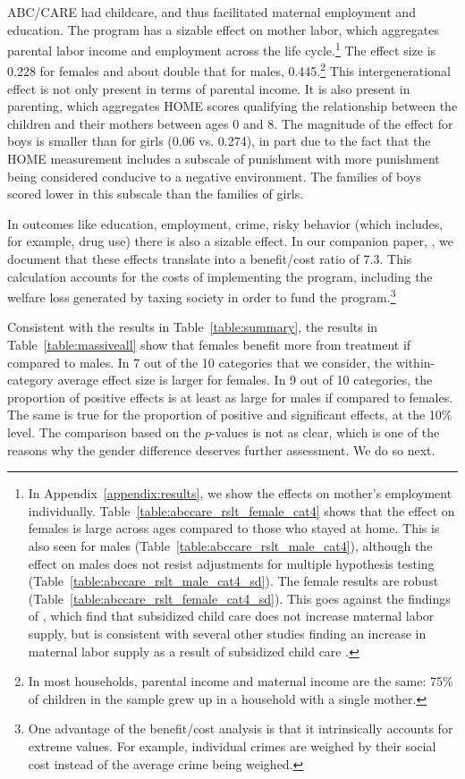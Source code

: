 ABC/CARE had childcare, and thus facilitated maternal employment and education. The program has a sizable effect on mother labor, which aggregates parental labor income and employment across the life cycle.\footnote{In Appendix~\ref{appendix:results}, we show the effects on mother's employment individually. Table~\ref{table:abccare_rslt_female_cat4} shows that the effect on females is large across ages compared to those who stayed at home. This is also seen for males (Table~\ref{table:abccare_rslt_male_cat4}), although the effect on males does not resist adjustments for multiple hypothesis testing (Table~\ref{table:abccare_rslt_male_cat4_sd}). The female results are robust (Table~\ref{table:abccare_rslt_female_cat4_sd}). This goes against the findings of \citet{Havnes_Mogstad_2011_JPE}, which find that subsidized child care does not increase maternal labor supply, but is consistent with several other studies finding an increase in maternal labor supply as a result of subsidized child care \citep{Bauernschuster_Schlotter_2015_JPE,Bettendorf_etal_2015_LE,Geyer_etal_2015_LE,Brilli_etal_2016_REH}.} The effect size is 0.228 for females and about double that for males, 0.445.\footnote{In most households, parental income and maternal income are the same: 75\% of children in the sample grew up in a household with a single mother.} This intergenerational effect is not only present in terms of parental income. It is also present in parenting, which aggregates HOME scores qualifying the relationship between the children and their mothers between ages 0 and 8. The magnitude of the effect for boys is smaller than for girls (0.06 vs. 0.274), in part due to the fact that the HOME measurement includes a subscale of punishment with more punishment being considered conducive to a negative environment. The families of boys scored lower in this subscale than the families of girls.

In outcomes like education, employment, crime, risky behavior (which includes, for example, drug use) there is also a sizable effect. In our companion paper, \citet{Garcia_Heckman_Leaf_etal_2017_Comp_CBA_Unpublished}, we document that these effects translate into a benefit/cost ratio of $7.3$. This calculation accounts for the costs of implementing the program, including the welfare loss generated by taxing society in order to fund the program.\footnote{One advantage of the benefit/cost analysis is that it intrinsically accounts for extreme values. For example, individual crimes are weighed by their social cost instead of the average crime being weighed.} 

Consistent with the results in Table~\ref{table:summary}, the results in Table~\ref{table:massiveall} show that females benefit more from treatment if compared to males. In 7 out of the 10 categories that we consider, the within-category average effect size is larger for females. In 9 out of 10 categories, the proportion of positive effects is at least as large for males if compared to females. The same is true for the proportion of positive and significant effects, at the 10\% level. The comparison based on the \citet{Rosenbaum_2005_Distribution_JRSS} $p$-values is not as clear, which is one of the reasons why the gender difference deserves further assessment. We do so next.


